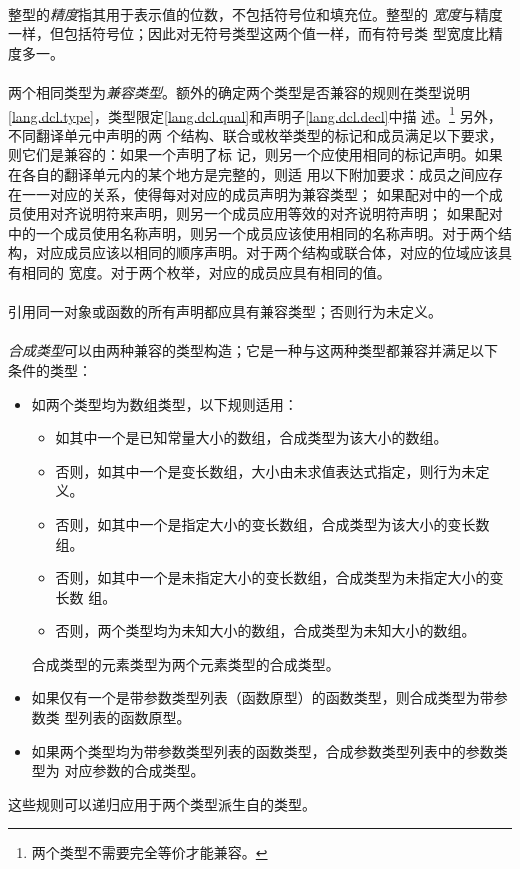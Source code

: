 \paragraph{}
整型的\textit{精度}指其用于表示值的位数，不包括符号位和填充位。整型的
\textit{宽度}与精度一样，但包括符号位；因此对无符号类型这两个值一样，而有符号类
型宽度比精度多一。

\paragraph{}
两个相同类型为\textit{兼容类型}。额外的确定两个类型是否兼容的规则在类型说明
\ref{lang.dcl.type}，类型限定\ref{lang.dcl.qual}和声明子\ref{lang.dcl.decl}中描
述。\footnote{两个类型不需要完全等价才能兼容。} 另外，不同翻译单元中声明的两
个结构、联合或枚举类型的标记和成员满足以下要求，则它们是兼容的：如果一个声明了标
记，则另一个应使用相同的标记声明。如果在各自的翻译单元内的某个地方是完整的，则适
用以下附加要求：成员之间应存在一一对应的关系，使得每对对应的成员声明为兼容类型；
如果配对中的一个成员使用对齐说明符来声明，则另一个成员应用等效的对齐说明符声明；
如果配对中的一个成员使用名称声明，则另一个成员应该使用相同的名称声明。对于两个结
构，对应成员应该以相同的顺序声明。对于两个结构或联合体，对应的位域应该具有相同的
宽度。对于两个枚举，对应的成员应具有相同的值。

\paragraph{}
引用同一对象或函数的所有声明都应具有兼容类型；否则行为未定义。

\paragraph{}
\textit{合成类型}可以由两种兼容的类型构造；它是一种与这两种类型都兼容并满足以下
条件的类型：
\begin{itemize}
  \item{如两个类型均为数组类型，以下规则适用：
    \begin{itemize}
      \item{如其中一个是已知常量大小的数组，合成类型为该大小的数组。}
      \item{否则，如其中一个是变长数组，大小由未求值表达式指定，则行为未定义。}
      \item{否则，如其中一个是指定大小的变长数组，合成类型为该大小的变长数组。}
      \item{否则，如其中一个是未指定大小的变长数组，合成类型为未指定大小的变长数
        组。}
      \item{否则，两个类型均为未知大小的数组，合成类型为未知大小的数组。}
    \end{itemize}
    合成类型的元素类型为两个元素类型的合成类型。}
  \item{如果仅有一个是带参数类型列表（函数原型）的函数类型，则合成类型为带参数类
    型列表的函数原型。}
  \item{如果两个类型均为带参数类型列表的函数类型，合成参数类型列表中的参数类型为
    对应参数的合成类型。}
\end{itemize}
这些规则可以递归应用于两个类型派生自的类型。

